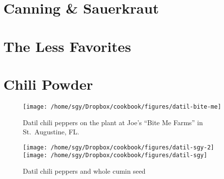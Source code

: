\documentclass[12pt, final]{book}
\begin{document}
\chapter{Canning \& Sauerkraut}

\newpage

\newpage
\chapter{The Less Favorites}\label{chapter3}

\newpage

\newpage

\newpage

\newpage

\newpage

\chapter{Chili Powder}







\begin{figure}
\begin{center}
\texttt{[image: /home/sgy/Dropbox/cookbook/figures/datil-bite-me]}
\end{center}
\caption*{Datil chili peppers on the plant at Joe's ``Bite Me Farms'' in St.\ Augustine, FL.}
\end{figure}
\begin{figure}
\begin{center}
\texttt{[image: /home/sgy/Dropbox/cookbook/figures/datil-sgy-2]}
\texttt{[image: /home/sgy/Dropbox/cookbook/figures/datil-sgy]}
\end{center}
\caption*{Datil chili peppers and whole cumin seed}
\end{figure}
\end{document}
